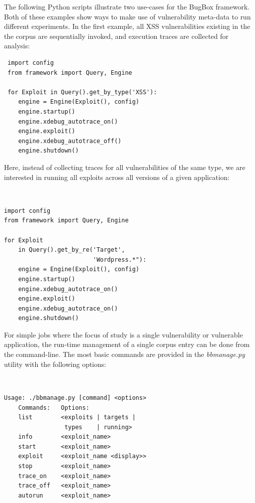 \documentclass[letterpaper,twocolumn,10pt]{article}
\begin{document}
The following Python scripts illustrate two use-cases for the BugBox framework. Both of these examples show ways to make use of vulnerability meta-data to run different experiments. In the first example, all XSS vulnerabilities existing in the the corpus are sequentially invoked, and execution traces are collected for analysis:

\begin{minipage}{\textwidth}
{\tt \footnotesize

\begin{lstlisting}
 import config
 from framework import Query, Engine
 
 for Exploit in Query().get_by_type('XSS'):
    engine = Engine(Exploit(), config)
    engine.startup()
    engine.xdebug_autotrace_on()
    engine.exploit()
    engine.xdebug_autotrace_off()
    engine.shutdown()
\end{lstlisting}
}
\end{minipage}


Here, instead of collecting traces for all vulnerabilities of the same type, we are interested in running all exploits across all versions of a given application:

\begin{minipage}{\textwidth}
{\tt \footnotesize
\begin{lstlisting}
import config
from framework import Query, Engine

for Exploit 
    in Query().get_by_re('Target', 
                         'Wordpress.*"):
    engine = Engine(Exploit(), config)
    engine.startup()
    engine.xdebug_autotrace_on()
    engine.exploit()
    engine.xdebug_autotrace_on()
    engine.shutdown()
\end{lstlisting}
}
\end{minipage}

For simple jobs where the focus of study is a single vulnerability or vulnerable application, the run-time management of a single corpus entry can be done from the command-line. The most basic commands are provided in the \emph{bbmanage.py} utility with the following options:

{\tt \footnotesize
\begin{verbatim}
Usage: ./bbmanage.py [command] <options>
    Commands:   Options:
    list        <exploits | targets | 
                 types    | running>
    info        <exploit_name>
    start       <exploit_name>
    exploit     <exploit_name <display>>
    stop        <exploit_name>
    trace_on    <exploit_name>
    trace_off   <exploit_name>
    autorun     <exploit_name>
\end{verbatim}
}
\end{document}
